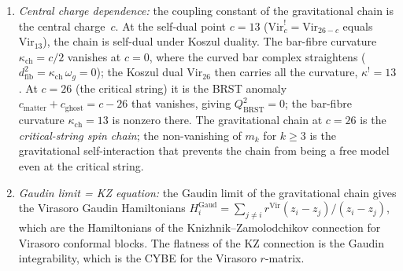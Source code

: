 \begin{construction}
\begin{enumerate}[label=\textup{(\roman*)}]
\item \emph{Central charge dependence:} the coupling
 constant of the gravitational chain is the central
 charge~$c$. At the self-dual point $c = 13$
 ($\mathrm{Vir}_c^! = \mathrm{Vir}_{26-c}$ equals
 $\mathrm{Vir}_{13}$), the chain is self-dual under Koszul
 duality. The bar-fibre curvature $\kappa_{\mathrm{ch}} = c/2$
 vanishes at $c = 0$, where the curved bar complex straightens
 ($d^2_{\mathrm{fib}} = \kappa_{\mathrm{ch}}\,\omega_g = 0$);
 the Koszul dual $\mathrm{Vir}_{26}$ then carries all the
 curvature, $\kappa^! = 13$. At $c = 26$ (the critical string)
 it is the BRST anomaly $c_{\mathrm{matter}} + c_{\mathrm{ghost}}
 = c - 26$ that vanishes, giving $Q_{\mathrm{BRST}}^2 = 0$;
 the bar-fibre curvature $\kappa_{\mathrm{ch}} = 13$ is nonzero
 there. The gravitational chain at $c = 26$ is the
 \emph{critical-string spin chain}; the non-vanishing
 of $m_k$ for $k \ge 3$ is the gravitational
 self-interaction that prevents the chain from being
 a free model even at the critical string.

\item \emph{Gaudin limit = KZ equation:}
 the Gaudin limit of the gravitational chain
 gives the Virasoro Gaudin Hamiltonians
 $H_i^{\mathrm{Gaud}} = \sum_{j \ne i}
 r^{\mathrm{Vir}}(z_i - z_j)/(z_i - z_j)$,
 which are the Hamiltonians of the Knizhnik--Zamolodchikov
 connection for Virasoro conformal blocks. The flatness
 of the KZ connection is the Gaudin integrability,
 which is the CYBE for the Virasoro $r$-matrix.
\end{enumerate}
\end{construction}

